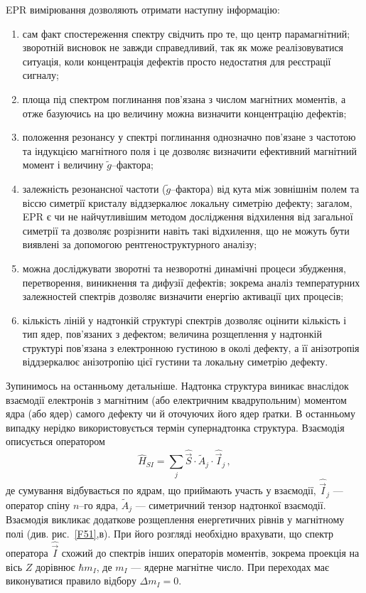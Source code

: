 \documentclass[10pt,a5paper,titlepage,oneside]{book}
\numberwithin{equation}{part}
\begin{document}
EPR вимірювання дозволяють отримати наступну інформацію:
\begin{enumerate}[label=\asbuk*),leftmargin=0em,itemindent=1.5em]
\item сам факт спостереження спектру свідчить про те, що центр парамагнітний;
 зворотній висновок не завжди справедливий, так як може реалізовуватися ситуація, коли концентрація
 дефектів просто недостатня для реєстрації сигналу;
\item площа під спектром поглинання пов'язана з числом магнітних моментів,
а отже базуючись на цю величину можна визначити концентрацію дефектів;
\item положення резонансу у спектрі поглинання однозначно пов'язане з частотою
та індукцією магнітного поля і це дозволяє визначити ефективний магнітний момент і
величину $\tilde{g}$--фактора;
\item залежність резонансної частоти ($\tilde{g}$--фактора) від кута між зовнішнім полем та віссю симетрії
кристалу віддзеркалює локальну симетрію дефекту;
загалом, EPR є чи не найчутливішим методом дослідження відхилення від загальної
симетрії та дозволяє розрізнити навіть такі відхилення, що
не можуть бути виявлені за допомогою рентгеноструктурного аналізу;
\item можна досліджувати
зворотні та незворотні динамічні процеси збудження,
перетворення, виникнення та дифузії дефектів;
зокрема аналіз температурних залежностей спектрів дозволяє
визначити енергію активації цих процесів;
\item кількість ліній у надтонкій структурі спектрів дозволяє
оцінити кількість і тип ядер, пов'язаних з дефектом;
величина розщеплення у надтонкій структурі пов'язана з електронною густиною
в околі дефекту, а її анізотропія віддзеркалює анізотропію цієї густини та локальну
симетрію дефекту.
\end{enumerate}

Зупинимось на останньому детальніше.
Надтонка структура виникає внаслідок взаємодії електронів
з магнітним (або електричним квадрупольним) моментом ядра (або ядер) самого
дефекту чи й  оточуючих його ядер ґратки.
В останньому випадку нерідко використовується термін супернадтонка структура.
Взаємодія описується оператором
\begin{equation}
\hat{H}_{SI}=\sum_j\hat{\vec{S}}\cdot\tilde{A}_j\cdot\hat{\vec{I}}_j\,,
\end{equation}
де сумування відбувається по ядрам, що приймають участь у взаємодії,
$\hat{\vec{I}}_j$ --- оператор спіну $n$--го ядра,
$\tilde{A}_j$ --- симетричний тензор надтонкої взаємодії.
Взаємодія викликає додаткове розщеплення енергетичних рівнів у магнітному полі
(див. рис.~\ref{F51},в).
При його розгляді необхідно врахувати, що
спектр оператора $\hat{\vec{I}}$ схожий до спектрів інших операторів моментів,
зокрема проекція на вісь $Z$ дорівнює $\hbar m_I$,
де $m_I$ --- ядерне магнітне число.
При переходах має виконуватися правило відбору $\Delta m_I=0$.
\end{document}
